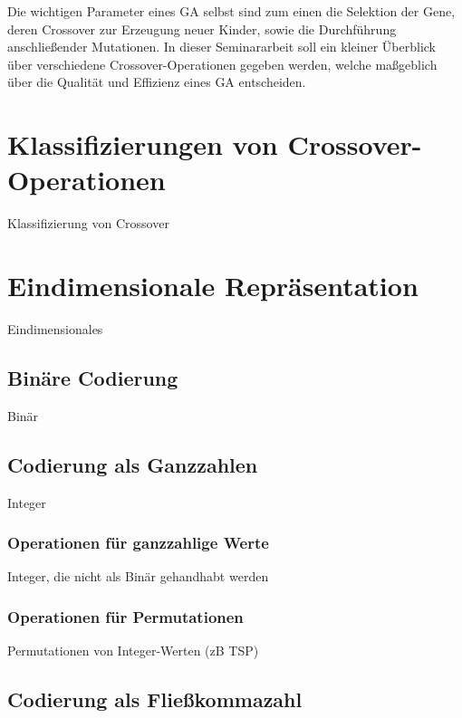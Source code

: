 \documentclass{llncs}
\begin{document}
	Die wichtigen Parameter eines GA selbst sind zum einen die Selektion der Gene, deren Crossover zur Erzeugung neuer Kinder, sowie die Durchführung anschließender Mutationen. In dieser Seminararbeit soll ein kleiner Überblick über verschiedene Crossover-Operationen gegeben werden, welche maßgeblich über die Qualität und Effizienz eines GA entscheiden.

\section{Klassifizierungen von Crossover-Operationen}
\label{sec:KlassifizierungCrossover}

Klassifizierung von Crossover

\section{Eindimensionale Repräsentation}
\label{sec:EindimensionaleRep}

Eindimensionales

\subsection{Binäre Codierung}
\label{sec:BinCod}

Binär

\subsection{Codierung als Ganzzahlen}
\label{sec:IntCod}

Integer

\subsubsection{Operationen für ganzzahlige Werte}
\label{sec:IntOp}

Integer, die nicht als Binär gehandhabt werden

\subsubsection{Operationen für Permutationen}
\label{sec:PermOp}

Permutationen von Integer-Werten (zB TSP)

\subsection{Codierung als Fließkommazahl}
\label{sec:FloatCod}
\end{document}
